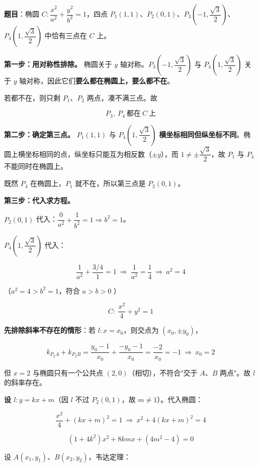 
\textbf{题目}：椭圆 $C:\dfrac{x^{2}}{a^{2}}+\dfrac{y^{2}}{b^{2}}=1$，四点 $P_1(1,1)$、$P_2(0,1)$、$P_3\left(-1,\dfrac{\sqrt3}2\right)$、$P_4\left(1,\dfrac{\sqrt3}2\right)$ 中恰有三点在 $C$ 上。


\textbf{第一步：用对称性排除。} 椭圆关于 $y$ 轴对称。$P_3\left(-1,\dfrac{\sqrt3}2\right)$ 与 $P_4\left(1,\dfrac{\sqrt3}2\right)$ 关于 $y$ 轴对称，因此它们\textbf{要么都在椭圆上，要么都不在}。

若都不在，则只剩 $P_1$、$P_2$ 两点，凑不满三点。故

\[P_3,\ P_4\ \text{都在}\ C\ \text{上}\]

\textbf{第二步：确定第三点。} $P_1(1,1)$ 与 $P_4\left(1,\dfrac{\sqrt3}2\right)$ \textbf{横坐标相同但纵坐标不同}。椭圆上横坐标相同的点，纵坐标只能互为相反数（$\pm y$），而 $1\ne\pm\dfrac{\sqrt3}2$，故 $P_1$ 与 $P_4$ 不能同时在椭圆上。

既然 $P_4$ 在椭圆上，$P_1$ 就不在，所以第三点是 $P_2(0,1)$。

\textbf{第三步：代入求方程。}

$P_2(0,1)$ 代入：$\dfrac0{a^{2}}+\dfrac1{b^{2}}=1\Rightarrow b^{2}=1$。

$P_4\left(1,\dfrac{\sqrt3}2\right)$ 代入：

\[\frac1{a^{2}}+\frac{3/4}1=1\ \Longrightarrow\ \frac1{a^{2}}=\frac14\ \Longrightarrow\ a^{2}=4\]

（$a^{2}=4>b^{2}=1$，符合 $a>b>0$ ）

\[C:\ \frac{x^{2}}4+y^{2}=1\]


\textbf{先排除斜率不存在的情形}：若 $l:x=x_0$，则交点为 $\left(x_0,\pm y_0\right)$，

\[k_{P_2A}+k_{P_2B}=\frac{y_0-1}{x_0}+\frac{-y_0-1}{x_0}=\frac{-2}{x_0}=-1\ \Longrightarrow\ x_0=2\]

但 $x=2$ 与椭圆只有一个公共点 $(2,0)$（相切），不符合"交于 $A$、$B$ 两点"。故 $l$ 的斜率存在。

\textbf{设 $l:y=kx+m$}（因 $l$ 不过 $P_2(0,1)$，故 $m\ne1$）。代入椭圆：

\[\frac{x^{2}}4+(kx+m)^{2}=1\ \Longrightarrow\ x^{2}+4(kx+m)^{2}=4\]

\[\left(1+4k^{2}\right)x^{2}+8kmx+\left(4m^{2}-4\right)=0\]

设 $A\left(x_1,y_1\right)$、$B\left(x_2,y_2\right)$，韦达定理：


